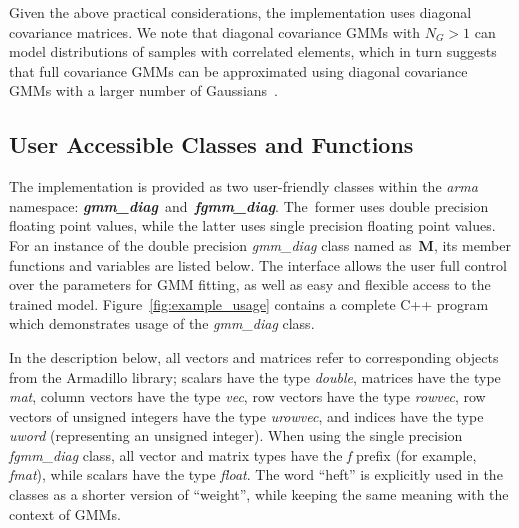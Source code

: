\noindent
Given the above practical considerations, the implementation uses diagonal covariance matrices.
We note that diagonal covariance GMMs with $N_G > 1$ can model distributions of samples with correlated elements,
which in turn suggests that full covariance GMMs can be approximated using diagonal covariance GMMs with a larger number of Gaussians~\cite{Reynolds_2000}.


\vspace{1ex}
\subsection{User Accessible Classes and Functions}

The implementation is provided as two user-friendly classes within the {\it arma} namespace:
{\it\bfseries gmm\_diag}~and~{\it\bfseries fgmm\_diag}.
The~former uses double precision floating point values, while the latter uses single precision floating point values.
For an instance of the double precision {\it gmm\_diag} class named as~{\bf M},
its member functions and variables are listed below.
The interface allows the user full control over the parameters for GMM fitting,
as well as easy and flexible access to the trained model.
Figure~\ref{fig:example_usage} contains a complete C++ program which demonstrates usage of the {\it gmm\_diag} class.

In the description below, all vectors and matrices refer to corresponding objects from the Armadillo library;
scalars have the type {\it double},
matrices have the type {\it mat},
column vectors have the type {\it vec},
row vectors have the type {\it rowvec},
row vectors of unsigned integers have the type {\it urowvec},
and indices have the type {\it uword} (representing an unsigned integer).
When using the single precision {\it fgmm\_diag} class,
all vector and matrix types have the {\it f} prefix (for example, {\it fmat}),
while scalars have the type {\it float}.
The word ``heft'' is explicitly used in the classes as a shorter version of ``weight'', while keeping the same meaning with the context of GMMs.

